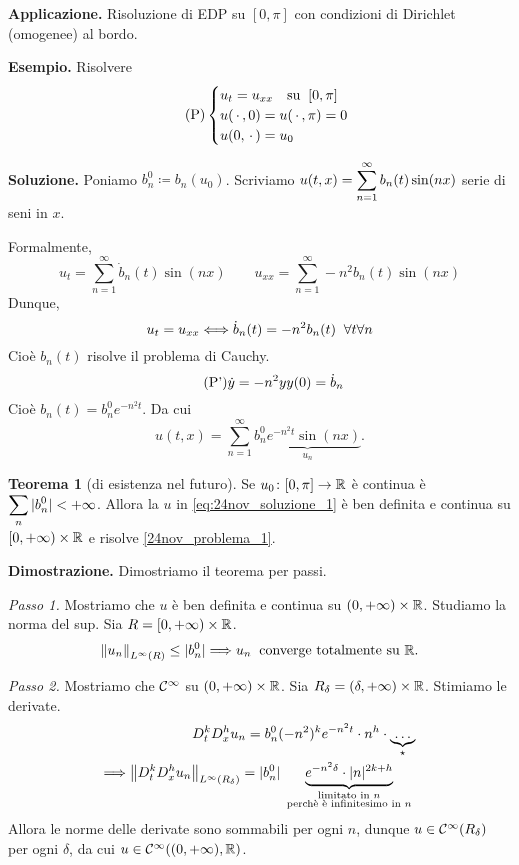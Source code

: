 \textbf{Applicazione.} Risoluzione di EDP su $[0,\pi]$ con condizioni di Dirichlet (omogenee) al bordo.

\textbf{Esempio.} Risolvere
%
\begin{equation}
\label{24nov_problema_1} \tag{P}
	\begin{cases}
		u_t = u_{xx} \quad \text{su} \;\; [0,\pi] \\
		u(\,\cdot\,, 0) = u(\,\cdot\,,\pi) = 0 \\
		u(0,\,\cdot\,) = u_0
	\end{cases} 
\end{equation}

\textbf{Soluzione.} Poniamo $b_n^0 \coloneqq b_n (u_0)$.
Scriviamo $\displaystyle u(t,x) = \sum_{n=1}^{\infty} b_n(t) \sin(nx) $ serie di seni in $x$.

Formalmente,
%
$$
	u_t = \sum_{n=1}^\infty \dot b_n(t) \sin(nx) \qquad 
	u_{xx} = \sum_{n=1}^{\infty} -n^2 b_n(t) \sin(nx) 
$$
%
Dunque, 
%
$$
	u_t = u_{xx} \Longleftrightarrow \dot b_n(t) = -n^2 b_n(t) \;\; \forall t \forall n
$$
%
Cioè $b_n(t)$ risolve il problema di Cauchy.
\begin{equation}
\label{24nov_problema_2} \tag{P'}
	\dot y = -n^2 y \\
	y(0) = \dot b_n
\end{equation}
Cioè $b_n(t) = b_n^0 e^{-n^2 t}$. Da cui  
\begin{equation}
\label{24nov_soluzione_1} \tag{$\ast$}
	u(t,x) = \sum_{n=1}^\infty \underbrace{b_n^0 e^{-n^2t} \sin(nx)}_{u_n}.
\end{equation}


\textbf{Teorema 1} (di esistenza nel futuro).
Se $u_0 \colon [0,\pi] \to \mathbb R$ è continua è $\displaystyle \sum_n |b_n^0| < +\infty$.
Allora la $u$ in \eqref{eq:24nov_soluzione_1} è ben definita e continua su $[0,+\infty) \times \mathbb R$ e risolve \eqref{24nov_problema_1}.

\textbf{Dimostrazione.} Dimostriamo il teorema per passi.

\textit{Passo 1.}
Mostriamo che $u$ è ben definita e continua su $(0,+\infty) \times \mathbb R$.
Studiamo la norma del sup. Sia $R = [0, +\infty) \times \mathbb R$.
%
$$
	\left\lVert u_n \right\rVert_{L^\infty(R)} \leq |b_n^0| \Longrightarrow u_n \;\; \text{converge totalmente su } \mathbb R.
$$
%

\textit{Passo 2.} Mostriamo che $\mathcal{C}^\infty$ su $(0,+\infty) \times \mathbb R$.
Sia $R_\delta = (\delta, +\infty) \times \mathbb R$.
Stimiamo le derivate.
\begin{align*}
	D_t^k D_x^h u_n = b_n^0 (-n^2)^k e^{-n^2t} \cdot n^h \cdot \underbrace{\ldots}_{\star} \\
	\Longrightarrow \left\lVert D_t^k D_x^h u_n \right\rVert_{L^\infty(R_\delta)} 
	= |b_n^0| \underbrace{e^{-n^2\delta} \cdot |n|^{2k+h}}_{\substack{\text{limitato in $n$} \\ \text{ perchè è infinitesimo in $n$ }}}
\end{align*}
Allora le norme delle derivate sono sommabili per ogni $n$, dunque $u \in \mathcal{C}^\infty(R_\delta)$ per ogni $\delta$, da cui $u \in \mathcal{C}^\infty( (0,+\infty),\mathbb R)$.

